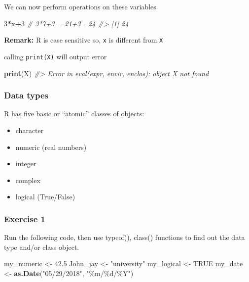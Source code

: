 \documentclass[
]{book}
\newenvironment{Shaded}{\begin{snugshade}}{\end{snugshade}}
\newcommand{\CommentTok}[1]{\textcolor[rgb]{0.56,0.35,0.01}{\textit{#1}}}
\newcommand{\ConstantTok}[1]{\textcolor[rgb]{0.56,0.35,0.01}{#1}}
\newcommand{\DecValTok}[1]{\textcolor[rgb]{0.00,0.00,0.81}{#1}}
\newcommand{\FloatTok}[1]{\textcolor[rgb]{0.00,0.00,0.81}{#1}}
\newcommand{\FunctionTok}[1]{\textcolor[rgb]{0.13,0.29,0.53}{\textbf{#1}}}
\newcommand{\NormalTok}[1]{#1}
\newcommand{\OtherTok}[1]{\textcolor[rgb]{0.56,0.35,0.01}{#1}}
\newcommand{\SpecialCharTok}[1]{\textcolor[rgb]{0.81,0.36,0.00}{\textbf{#1}}}
\newcommand{\StringTok}[1]{\textcolor[rgb]{0.31,0.60,0.02}{#1}}
\providecommand{\tightlist}{%
  \setlength{\itemsep}{0pt}\setlength{\parskip}{0pt}}
\begin{document}
We can now perform operations on these variables

\begin{Shaded}
\begin{Highlighting}[]
\DecValTok{3}\SpecialCharTok{*}\NormalTok{x}\SpecialCharTok{+}\DecValTok{3} \CommentTok{\# 3*7+3 = 21+3 =24}
\CommentTok{\#\textgreater{} [1] 24}
\end{Highlighting}
\end{Shaded}

\textbf{Remark:} R is case sensitive so, \texttt{x} is different from \texttt{X}

calling \texttt{print(X)} will output error

\begin{Shaded}
\begin{Highlighting}[]
\FunctionTok{print}\NormalTok{(X)}
\CommentTok{\#\textgreater{} Error in eval(expr, envir, enclos): object \textquotesingle{}X\textquotesingle{} not found}
\end{Highlighting}
\end{Shaded}

\subsubsection*{Data types}\label{data-types}

R has five basic or ``atomic'' classes of objects:

\begin{itemize}
\tightlist
\item
  character
\item
  numeric (real numbers)
\item
  integer
\item
  complex
\item
  logical (True/False)
\end{itemize}

\subsubsection*{Exercise 1}\label{exercise-1}

Run the following code, then use typeof(), class() functions to find out the data type and/or class object.

\begin{Shaded}
\begin{Highlighting}[]
\NormalTok{my\_numeric }\OtherTok{\textless{}{-}} \FloatTok{42.5}
\NormalTok{John\_jay }\OtherTok{\textless{}{-}} \StringTok{"university"}
\NormalTok{my\_logical }\OtherTok{\textless{}{-}} \ConstantTok{TRUE}
\NormalTok{my\_date }\OtherTok{\textless{}{-}} \FunctionTok{as.Date}\NormalTok{(}\StringTok{"05/29/2018"}\NormalTok{, }\StringTok{"\%m/\%d/\%Y"}\NormalTok{)}
\end{Highlighting}
\end{Shaded}
\end{document}

